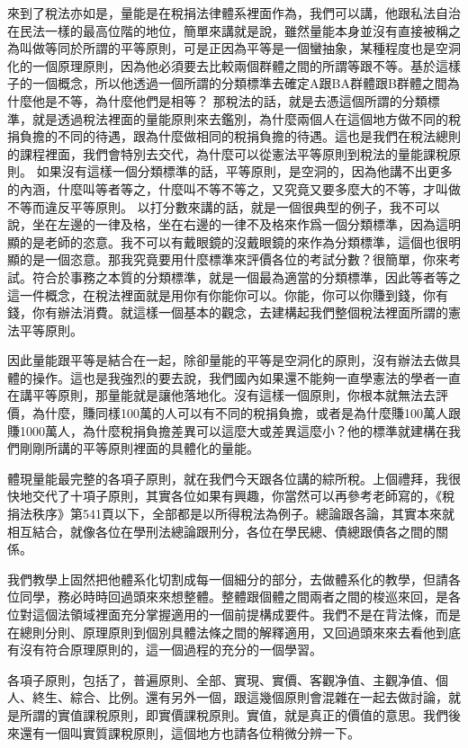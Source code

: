\documentclass[]{ctexbook}
\begin{document}
來到了稅法亦如是，量能是在稅捐法律體系裡面作為，我們可以講，他跟私法自治在民法一樣的最高位階的地位，簡單來講就是說，雖然量能本身並沒有直接被稱之為叫做等同於所謂的平等原則，可是正因為平等是一個蠻抽象，某種程度也是空洞化的一個原理原則，因為他必須要去比較兩個群體之間的所謂等跟不等。基於這樣子的一個概念，所以他透過一個所謂的分類標準去確定A跟BA群體跟B群體之間為什麼他是不等，為什麼他們是相等？ 那稅法的話，就是去憑這個所謂的分類標準，就是透過稅法裡面的量能原則來去鑑別，為什麼兩個人在這個地方做不同的稅捐負擔的不同的待遇，跟為什麼做相同的稅捐負擔的待遇。這也是我們在稅法總則的課程裡面，我們會特別去交代，為什麼可以從憲法平等原則到稅法的量能課稅原則。
如果沒有這樣一個分類標準的話，平等原則，是空洞的，因為他講不出更多的內涵，什麼叫等者等之，什麼叫不等不等之，又究竟又要多麼大的不等，才叫做不等而違反平等原則。
以打分數來講的話，就是一個很典型的例子，我不可以說，坐在左邊的一律及格，坐在右邊的一律不及格來作爲一個分類標準，因為這明顯的是老師的恣意。我不可以有戴眼鏡的沒戴眼鏡的來作為分類標準，這個也很明顯的是一個恣意。那我究竟要用什麼標準來評價各位的考試分數？很簡單，你來考試。符合於事務之本質的分類標準，就是一個最為適當的分類標準，因此等者等之這一件概念，在稅法裡面就是用你有你能你可以。你能，你可以你賺到錢，你有錢，你有辦法消費。就這樣一個基本的觀念，去建構起我們整個稅法裡面所謂的憲法平等原則。

因此量能跟平等是結合在一起，除卻量能的平等是空洞化的原則，沒有辦法去做具體的操作。這也是我強烈的要去說，我們國內如果還不能夠一直學憲法的學者一直在講平等原則，那量能就是讓他落地化。沒有這樣一個原則，你根本就無法去評價，為什麼，賺同樣100萬的人可以有不同的稅捐負擔，或者是為什麼賺100萬人跟賺1000萬人，為什麼稅捐負擔差異可以這麼大或差異這麼小？他的標準就建構在我們剛剛所講的平等原則裡面的具體化的量能。

體現量能最完整的各項子原則，就在我們今天跟各位講的綜所稅。上個禮拜，我很快地交代了十項子原則，其實各位如果有興趣，你當然可以再參考老師寫的，《稅捐法秩序》第541頁以下，全部都是以所得稅法為例子。總論跟各論，其實本來就相互結合，就像各位在學刑法總論跟刑分，各位在學民總、債總跟債各之間的關係。

我們教學上固然把他體系化切割成每一個細分的部分，去做體系化的教學，但請各位同學，務必時時回過頭來來想整體。整體跟個體之間兩者之間的梭巡來回，是各位對這個法領域裡面充分掌握適用的一個前提構成要件。我們不是在背法條，而是在總則分則、原理原則到個別具體法條之間的解釋適用，又回過頭來來去看他到底有沒有符合原理原則的，這一個過程的充分的一個學習。

各項子原則，包括了，普遍原則、全部、實現、實價、客觀净值、主觀净值、個人、終生、綜合、比例。還有另外一個，跟這幾個原則會混雜在一起去做討論，就是所謂的實值課稅原則，即實價課稅原則。實值，就是真正的價值的意思。我們後來還有一個叫實質課稅原則，這個地方也請各位稍微分辨一下。
\end{document}
